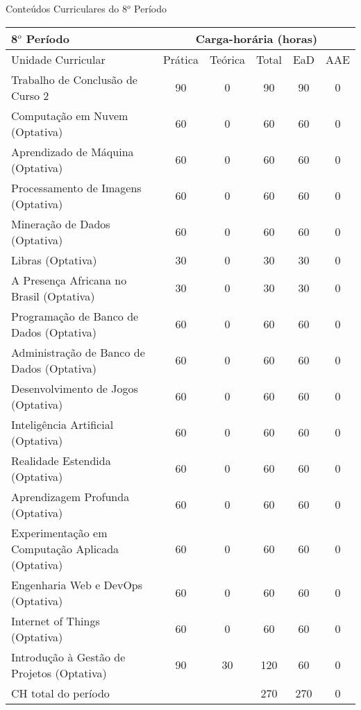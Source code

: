 \begin{quadro}[ht!]
\centering
\caption{Conteúdos Curriculares do 8$^o$ Período}\label{qua:periodo8}
\begin{tabular}{|p{8.0cm}|c|c|c|c|c|}
\hline
\rowcolor{blue1} 8$^o$ Período & \multicolumn{5}{|c|}{\centering Carga-horária (horas)} \\ \hline
\rowcolor{blue1} Unidade Curricular & Prática & Teórica & Total & EaD & AAE \\ \hline
Trabalho de Conclusão de Curso 2 & 90 & 0 & 90 & 90	&	0 \\	\hline
Computação em Nuvem (Optativa) & 60 & 0 & 60 & 60	&	0 \\	\hline
Aprendizado de Máquina (Optativa) & 60 & 0 & 60 & 60	&	0 \\	\hline
Processamento de Imagens (Optativa) & 60 & 0 & 60 & 60	&	0 \\	\hline
Mineração de Dados (Optativa) & 60 & 0 & 60 & 60	&	0 \\	\hline
Libras (Optativa) & 30 & 0 & 30 & 30	&	0 \\	\hline
A Presença Africana no Brasil (Optativa) & 30 & 0 & 30 & 30	&	0 \\	\hline
Programação de Banco de Dados (Optativa) & 60 & 0 & 60 & 60	&	0 \\	\hline
Administração de Banco de Dados (Optativa) & 60 & 0 & 60 & 60	&	0 \\	\hline
Desenvolvimento de Jogos (Optativa) & 60 & 0 & 60 & 60	&	0 \\	\hline
Inteligência Artificial (Optativa) & 60 & 0 & 60 & 60	&	0 \\	\hline
Realidade Estendida (Optativa) & 60 & 0 & 60 & 60	&	0 \\	\hline
Aprendizagem Profunda (Optativa) & 60 & 0 & 60 & 60	&	0 \\	\hline
Experimentação em Computação Aplicada (Optativa) & 60 & 0 & 60 & 60	&	0 \\	\hline
Engenharia Web e DevOps (Optativa) & 60 & 0 & 60 & 60	&	0 \\	\hline
Internet of Things (Optativa) & 60 & 0 & 60 & 60	&	0 \\	\hline
Introdução à Gestão de Projetos (Optativa) & 90 & 30 & 120 & 60	&	0 \\	\hline
CH total do período & \multicolumn{2}{p{3.3cm}|}{\cellcolor{blue1}} & 270 & 270	&	0 \\ \hline
\end{tabular} \end{quadro}